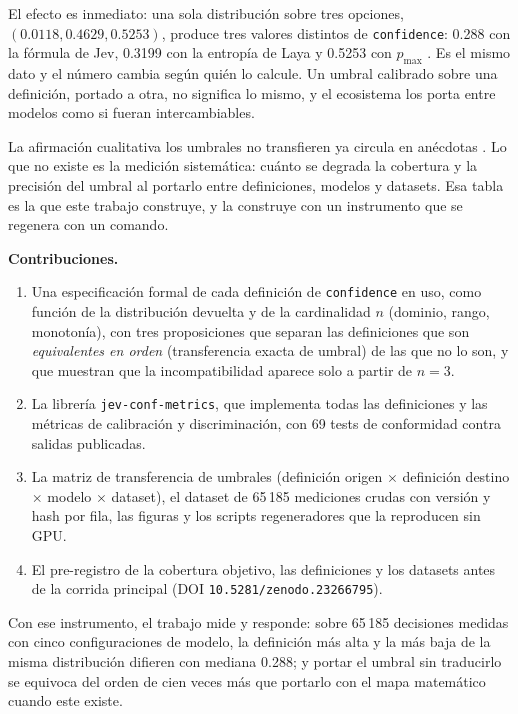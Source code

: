 El efecto es inmediato: una sola distribución sobre tres opciones, $(0.0118, 0.4629, 0.5253)$, produce
tres valores distintos de \texttt{confidence}: 0.288 con la fórmula de Jev, 0.3199 con la entropía
de Laya y 0.5253 con $p_{\max}$ \cite{rohitghumare}. Es el mismo dato y el número cambia según quién lo
calcule. Un umbral calibrado sobre una definición, portado a otra, no significa lo mismo, y el
ecosistema los porta entre modelos como si fueran intercambiables.

La afirmación cualitativa \guillemotleft los umbrales no transfieren\guillemotright{} ya circula en
anécdotas \cite{jebadiah}. Lo que no existe es la medición sistemática: cuánto se degrada
la cobertura y la precisión del umbral al portarlo entre definiciones, modelos y datasets. Esa tabla es la
que este trabajo construye, y la construye con un instrumento que se regenera con un comando.

\textbf{Contribuciones.}

\begin{enumerate}
\item Una especificación formal de cada definición de \texttt{confidence} en uso, como función de
  la distribución devuelta y de la cardinalidad $n$ (dominio, rango, monotonía), con tres
  proposiciones que separan las definiciones que son \emph{equivalentes en orden} (transferencia
  exacta de umbral) de las que no lo son, y que muestran que la incompatibilidad aparece solo a partir de
  $n = 3$.
\item La librería \texttt{jev-conf-metrics}, que implementa todas las definiciones y las métricas de
  calibración y discriminación, con 69 tests de conformidad contra salidas publicadas.
\item La matriz de transferencia de umbrales (definición origen $\times$ definición destino
  $\times$ modelo $\times$ dataset), el dataset de 65\,185 mediciones crudas con versión y hash por
  fila, las figuras y los scripts regeneradores que la reproducen sin GPU.
\item El pre-registro de la cobertura objetivo, las definiciones y los datasets antes de la corrida
  principal (DOI \texttt{10.5281/zenodo.23266795}).
\end{enumerate}

Con ese instrumento, el trabajo mide y responde: sobre 65\,185 decisiones medidas con cinco
configuraciones de modelo, la definición más alta y la más baja de la misma distribución difieren
con mediana 0.288; y portar el umbral sin traducirlo se equivoca del orden de cien veces
más que portarlo con el mapa matemático cuando este existe.

